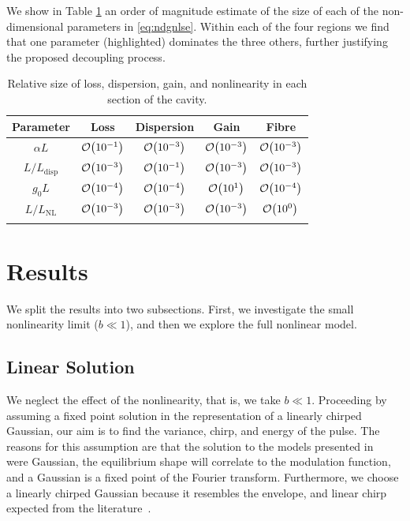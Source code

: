 \documentclass[9pt,twocolumn,twoside]{osajnl}
\let\originalleft\left
\let\originalright\right
\renewcommand{\left}{\mathopen{}\mathclose\bgroup\originalleft}
\renewcommand{\right}{\aftergroup\egroup\originalright}
\providecommand{\bigO}[1]{\ensuremath{\mathop{}\mathopen{}\mathcal{O}\mathopen{}\left(#1\right)}} %
\begin{document}
We show in Table \ref{tab:NDparams} an order of magnitude estimate of the size of each of the non-dimensional parameters in \eqref{eq:ndgnlse}. Within each of the four regions we find that one parameter (highlighted) dominates the three others, further justifying the proposed decoupling process.

\begin{table}[tbp]
	\centering
	\caption{Relative size of loss, dispersion, gain, and nonlinearity in each section of the cavity.}
 	\label{tab:NDparams}
 	\begin{tabular}{ccccc}
		\hline
		Parameter \hspace*{-1mm} & Loss & Dispersion & Gain & Fibre \\
		\hline\noalign{\smallskip}
		$\alpha L$ & \color{color2}$\bigO{10^{-1}}$ & $\bigO{10^{-3}}$ & $\bigO{10^{-3}}$ & $\bigO{10^{-3}}$ \\
		$L / L_\text{disp}$ & $\bigO{10^{-3}}$ & \color{color2}$\bigO{10^{-1}}$ & $\bigO{10^{-3}}$ & $\bigO{10^{-3}}$ \\
		$g_0 L$ & $\bigO{10^{-4}}$ & $\bigO{10^{-4}}$ & \color{color2}$\bigO{10^{1}}$ & $\bigO{10^{-4}}$ \\
		$L / L_\text{NL}$ & $\bigO{10^{-3}}$ & $\bigO{10^{-3}}$ & $\bigO{10^{-3}}$ & \color{color2}$\bigO{10^{0}}$ \\
		\noalign{\smallskip}\hline
	\end{tabular}
\end{table}

\section{Results}
\label{sec:results}
We split the results into two subsections. First, we investigate the small nonlinearity limit ($b \ll 1$), and then we explore the full nonlinear model.

\subsection{Linear Solution}
We neglect the effect of the nonlinearity, that is, we take $b \ll 1$. Proceeding by assuming a fixed point solution in the representation of a linearly chirped Gaussian, our aim is to find the variance, chirp, and energy of the pulse. The reasons for this assumption are that the solution to the models presented in~\cite{cutler1955, siegman1969, kuizenga1970a, martinez1984, martinez1985} were Gaussian, the equilibrium shape will correlate to the modulation function, and a Gaussian is a fixed point of the Fourier transform. Furthermore, we choose a linearly chirped Gaussian because it resembles the envelope, and linear chirp expected from the literature~\cite{burgoyne2014, haus1975, haus1996, haus2000, usechak2005}.
\end{document}
